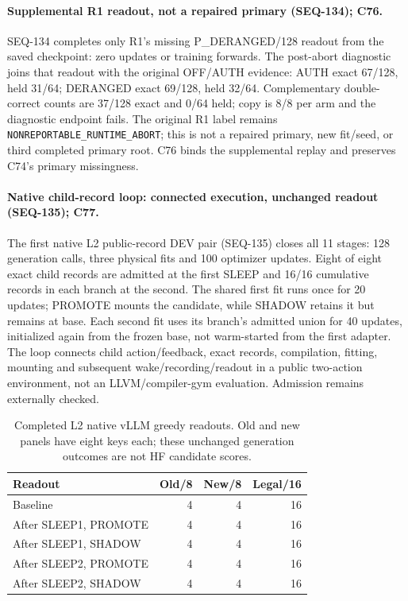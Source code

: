 \documentclass{article}
\begin{document}
\paragraph{Supplemental R1 readout, not a repaired primary (SEQ-134); C76.}
SEQ-134 completes only R1's missing P\_DERANGED/128 readout from the saved
checkpoint: zero updates or training forwards. The post-abort diagnostic joins
that readout with the original OFF/AUTH evidence: AUTH exact 67/128, held 31/64;
DERANGED exact 69/128, held 32/64. Complementary double-correct counts are 37/128
exact and 0/64 held; copy is 8/8 per arm and the diagnostic endpoint fails.
The original R1 label remains \texttt{NONREPORTABLE\_RUNTIME\_ABORT}; this is
not a repaired primary, new fit/seed, or third completed primary root. C76
binds the supplemental replay and preserves C74's primary missingness.

\paragraph{Native child-record loop: connected execution, unchanged readout (SEQ-135); C77.}
The first native L2 public-record DEV pair (SEQ-135) closes all 11 stages:
128 generation calls, three physical fits and 100 optimizer updates. Eight of
eight exact child records are admitted at the first SLEEP and 16/16 cumulative
records in each branch at the second. The shared first fit runs once for 20
updates; PROMOTE mounts the candidate, while SHADOW retains it but remains at
base. Each second fit uses its branch's admitted union for 40 updates, initialized
again from the frozen base, not warm-started from the first adapter. The loop
connects child action/feedback, exact records, compilation, fitting, mounting
and subsequent wake/recording/readout in a public two-action environment, not
an LLVM/compiler-gym evaluation. Admission remains externally checked.

\begin{table}[ht]
\centering
\caption{Completed L2 native vLLM greedy readouts. Old and new panels have eight
keys each; these unchanged generation outcomes are not HF candidate scores.}
\begin{tabular}{lrrr}
\toprule
Readout & Old/8 & New/8 & Legal/16 \\
\midrule
Baseline & 4 & 4 & 16 \\
After SLEEP1, PROMOTE & 4 & 4 & 16 \\
After SLEEP1, SHADOW & 4 & 4 & 16 \\
After SLEEP2, PROMOTE & 4 & 4 & 16 \\
After SLEEP2, SHADOW & 4 & 4 & 16 \\
\bottomrule
\end{tabular}
\end{table}
\end{document}
